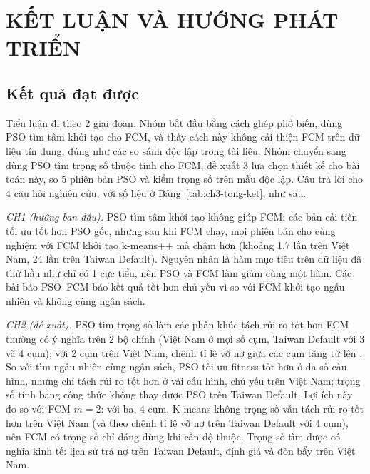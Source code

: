 \chapter*{KẾT LUẬN VÀ HƯỚNG PHÁT TRIỂN}

\section*{Kết quả đạt được}

Tiểu luận đi theo 2 giai đoạn. Nhóm bắt đầu bằng cách ghép phổ biến, dùng PSO tìm tâm khởi tạo cho FCM, và thấy cách này
không cải thiện FCM trên dữ liệu tín dụng, đúng như các so sánh độc lập trong tài liệu. Nhóm chuyển sang dùng PSO tìm trọng số
thuộc tính cho FCM, đề xuất 3 lựa chọn thiết kế cho bài toán này, so 5 phiên bản PSO và kiểm trọng số trên mẫu độc lập.
Câu trả lời cho 4 câu hỏi nghiên cứu, với số liệu ở Bảng~\ref{tab:ch3-tong-ket}, như sau.

\emph{CH1 (hướng ban đầu).} PSO tìm tâm khởi tạo không giúp FCM: các bản cải tiến tối ưu tốt hơn PSO gốc, nhưng sau khi FCM
chạy, mọi phiên bản cho cùng nghiệm với FCM khởi tạo k-means++ mà chậm hơn (khoảng 1,7 lần trên Việt Nam, 24 lần trên Taiwan Default). Nguyên nhân là hàm mục tiêu trên dữ liệu
đã thử hầu như chỉ có 1 cực tiểu, nên PSO và FCM làm giảm cùng một hàm. Các bài báo PSO--FCM báo kết quả tốt hơn chủ yếu vì
so với FCM khởi tạo ngẫu nhiên và không cùng ngân sách.

\emph{CH2 (đề xuất).} PSO tìm trọng số làm các phân khúc tách rủi ro tốt hơn FCM thường có ý nghĩa trên 2 bộ chính (Việt Nam
ở mọi số cụm, Taiwan Default với 3 và 4 cụm); với 2 cụm trên Việt Nam, chênh tỉ lệ vỡ nợ giữa các cụm tăng từ
\soLieuETamVietNamCHaiFcmKppChenhTiLe{} lên \soLieuETamVietNamCHaiPsoTrongSoChenhTiLe. So với tìm ngẫu nhiên cùng ngân sách, PSO
tối ưu fitness tốt hơn ở đa số cấu hình, nhưng chỉ tách rủi ro tốt hơn ở vài cấu hình, chủ yếu trên Việt Nam; trọng số tính bằng công thức không thay được PSO trên Taiwan Default.
Lợi ích này đo so với FCM $m = 2$: với ba, 4 cụm, K-means không trọng số vẫn tách rủi ro tốt hơn trên Việt Nam (và theo
chênh tỉ lệ vỡ nợ trên Taiwan Default với 4 cụm), nên FCM có trọng số chỉ đáng dùng khi cần độ thuộc. Trọng số tìm
được có nghĩa kinh tế: lịch sử trả nợ trên Taiwan Default, định giá và đòn bẩy trên Việt Nam.

